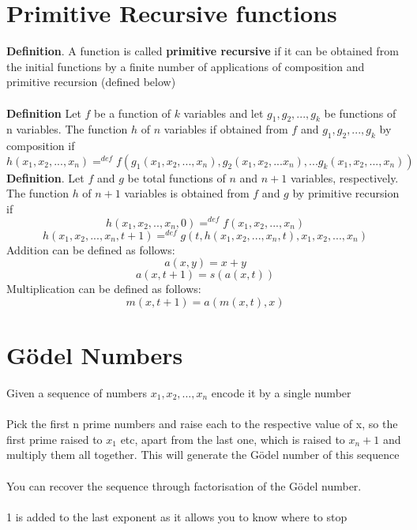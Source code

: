 \documentclass{article}[18pt]
\begin{document}
\section{Primitive Recursive functions}
\textbf{Definition}. A function is called \textbf{primitive recursive} if it can be obtained from the initial functions by a finite number of applications of composition and primitive recursion (defined below)\\
\\
\textbf{Definition} Let $f$ be a function of $k$ variables and let $g_1,g_2,...,g_k$ be functions of n variables. The function $h$ of $n$ variables if obtained from $f$ and $g_1,g_2,...,g_k$ by composition if
$$h(x_1,x_2,...,x_n)=^{def}f(g_1(x_1,x_2,...,x_n), g_2(x_1,x_2,...x_n),... g_k(x_1,x_2,...,x_n))$$
\textbf{Definition}. Let $f$ and $g$ be total functions of $n$ and $n+1$ variables, respectively. The function $h$ of $n+1$ variables is obtained from $f$ and $g$ by primitive recursion if
$$h(x_1,x_2,..,x_n,0)=^{def} f(x_1,x_2,...,x_n)$$
$$h(x_1,x_2,...,x_n,t+1)=^{def} g(t,h(x_1,x_2,...,x_n,t),x_1,x_2,...,x_n)$$
Addition can be defined as follows:
$$a(x,y)=x+y$$
$$a(x,t+1)=s(a(x,t))$$
Multiplication can be defined as follows:
$$m(x,t+1)=a(m(x,t),x)$$
\section{Gödel Numbers}
Given a sequence of numbers $x_1,x_2,...,x_n$ encode it by a single number\\
\\
Pick the first n prime numbers and raise each to the respective value of x, so the first prime raised to $x_1$ etc, apart from the last one, which is raised to $x_n+1$ and multiply them all together. This will generate the Gödel number of this sequence\\
\\
You can recover the sequence through factorisation of the Gödel number.\\
\\
1 is added to the last exponent as it allows you to know where to stop
\end{document}
